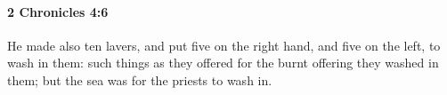 
		\paragraph{2 Chronicles 4:6} %
			\label{2CHRONICLES-4-6}

			He made also ten lavers, and put five on the right hand, and five on the left, to wash in them: such things as they offered for the burnt offering they washed in them; but the sea was for the priests to wash in.


